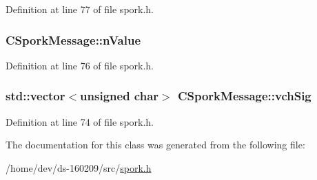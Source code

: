 Definition at line 77 of file spork.\+h.

\hypertarget{class_c_spork_message_ae15a1fa999993177b2549c4316c89643}{}
\subsubsection[{n\+Value}]{ C\+Spork\+Message\+::n\+Value}\label{class_c_spork_message_ae15a1fa999993177b2549c4316c89643}


Definition at line 76 of file spork.\+h.

\hypertarget{class_c_spork_message_a23740331f22a1ed4a8af5a299a618cc1}{}
\subsubsection[{vch\+Sig}]{\setlength{\rightskip}{0pt plus 5cm}std\+::vector$<$unsigned char$>$ C\+Spork\+Message\+::vch\+Sig}\label{class_c_spork_message_a23740331f22a1ed4a8af5a299a618cc1}


Definition at line 74 of file spork.\+h.



The documentation for this class was generated from the following file\+:\begin{DoxyCompactItemize}
\item 
/home/dev/ds-\/160209/src/\hyperlink{spork_8h}{spork.\+h}\end{DoxyCompactItemize}
